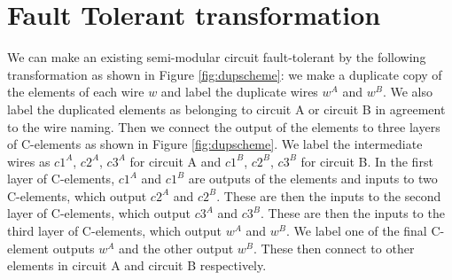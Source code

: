 \documentclass[12pt]{report}
\begin{document}
\section{Fault Tolerant transformation}

We can make an existing semi-modular circuit fault-tolerant by the following transformation as shown in Figure \ref{fig:dupscheme}: we make a duplicate copy of the elements of each wire $w$ and label the duplicate wires $w^A$ and $w^B$.  We also label the duplicated elements as belonging to circuit A or circuit B in agreement to the wire naming.  Then we connect the output of the elements to three layers of C-elements as shown in Figure \ref{fig:dupscheme}.  We label the intermediate wires as $c1^A$, $c2^A$, $c3^A$ for circuit A and $c1^B$, $c2^B$, $c3^B$ for circuit B.  In the first layer of C-elements, $c1^A$ and $c1^B$ are outputs of the elements and inputs to two C-elements, which output $c2^A$ and $c2^B$.  These are then the inputs to the second layer of C-elements, which output $c3^A$ and $c3^B$.  These are then the inputs to the third layer of C-elements, which output $w^A$ and $w^B$.  We label one of the final C-element outputs $w^A$ and the other output $w^B$.  These then connect to other elements in circuit A and circuit B respectively.  \\
\end{document}
